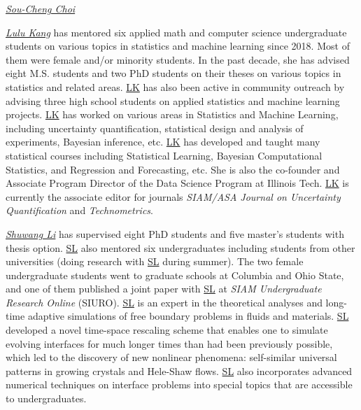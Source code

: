 \documentclass[11pt]{NSFamsart}
\newcommand{\LK}{\hyperlink{LKlink}{LK}\xspace}
\newcommand{\SL}{\hyperlink{SLlink}{SL}\xspace}
\begin{document}
\noindent\underline{\textit{Sou-Cheng Choi}} 

\noindent \underline{\textit{Lulu Kang}} has mentored six applied math and computer science undergraduate students on various topics in statistics and machine learning since 2018. Most of them were female and/or minority students. In the past decade, she has advised eight M.S. students and two PhD students on their theses on various topics in statistics and related areas. \LK has also been active in community outreach by advising three high school students on applied statistics and machine learning projects. 
\LK has worked on various areas in Statistics and Machine Learning, including uncertainty quantification, statistical design and analysis of experiments, Bayesian inference, etc. 
\LK has developed and taught many statistical courses including Statistical Learning, Bayesian Computational Statistics, and Regression and Forecasting, etc. She is also the co-founder and Associate Program Director of the Data Science Program at Illinois Tech. \LK is currently the associate editor for journals \emph{SIAM/ASA Journal on Uncertainty Quantification} and \emph{Technometrics}.

\noindent \underline{\textit{Shuwang Li}} has supervised eight PhD students and five master's students with thesis option. \SL also mentored six undergraduates including students from other universities (doing research with \SL during summer). The two female undergraduate students went to graduate schools at Columbia and Ohio State,  and one of them published a joint paper with \SL at {\it SIAM Undergraduate Research Online} (SIURO). 
\SL is an expert in the theoretical analyses and
long-time adaptive simulations of free boundary problems in  fluids and
materials. \SL developed a novel time-space
rescaling scheme that enables one to simulate evolving interfaces for much
longer times than had been previously possible, which led to the discovery of new nonlinear
phenomena: self-similar universal patterns in growing crystals and Hele-Shaw  flows. \SL also incorporates advanced numerical techniques on interface problems into special topics that are accessible to undergraduates. 

 
 
\end{document}
